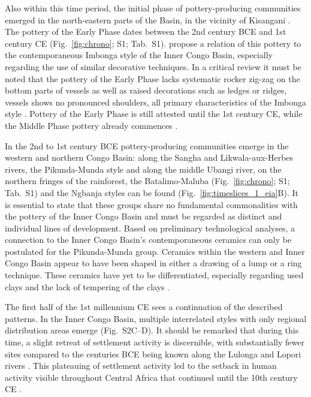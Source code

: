 \documentclass[smallextended,natbib]{svjour3}       %
\begin{document}
Also within this time period, the initial phase of pottery-producing communities emerged in the north-eastern parts of the Basin, in the vicinity of Kisangani \citep[Fig.~S2A;][]{LivingstoneSmith.2017}. The pottery of the Early Phase dates between the 2nd century BCE and 1st century CE (Fig.~\ref{fig:chrono}; S1; Tab.~S1). \citet[110,115]{LivingstoneSmith.2017} propose a relation of this pottery to the contemporaneous Imbonga style of the Inner Congo Basin, especially regarding the use of similar decorative techniques. In a critical review it must be noted that the pottery of the Early Phase \citep[112 Fig.~24]{LivingstoneSmith.2017} lacks systematic rocker zig-zag on the bottom parts of vessels as well as raised decorations such as ledges or ridges, vessels shows no pronounced shoulders, all primary characteristics of the Imbonga style \citep[170 Fig.~84.1--20]{Seidensticker.2021e}. Pottery of the Early Phase is still attested until the 1st century CE, while the Middle Phase pottery already commences \citep[Fig.~\ref{fig:chrono}; S1; Tab.~S1;][]{LivingstoneSmith.2017}.

In the 2nd to 1st century BCE pottery-producing communities emerge in the western and northern Congo Basin: along the Sangha and Likwala-aux-Herbes rivers, the Pikunda-Munda style and along the middle Ubangi river, on the northern fringes of the rainforest, the Batalimo-Maluba (Fig.~\ref{fig:chrono}; S1; Tab.~S1) and the Ngbanja styles can be found (Fig.~\ref{fig:timeslices_1_eia}B). It is essential to state that these groups share no fundamental commonalities with the pottery of the Inner Congo Basin and must be regarded as distinct and individual lines of development. Based on preliminary technological analyses, a connection to the Inner Congo Basin's contemporaneous ceramics can only be postulated for the Pikunda-Munda group. Ceramics within the western and Inner Congo Basin appear to have been shaped in either a drawing of a lump or a ring technique. These ceramics have yet to be differentiated, especially regarding used clays and the lack of tempering of the clays \citep{Seidensticker.2020}. 

The first half of the 1st millennium CE sees a continuation of the described patterns. In the Inner Congo Basin, multiple interrelated styles with only regional distribution areas emerge (Fig.~S2C--D). It should be remarked that during this time, a slight retreat of settlement activity is discernible, with substantially fewer sites compared to the centuries BCE being known along the Lulonga and Lopori rivers \citep[224]{Seidensticker.2021e}. This plateauing of settlement activity led to the setback in human activity visible throughout Central Africa that continued until the 10th century CE \citep{Seidensticker.2021}.
\end{document}
